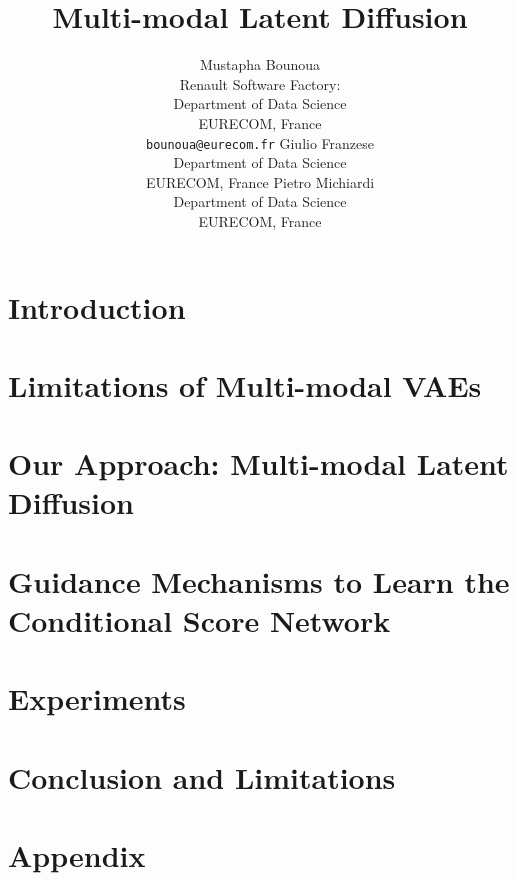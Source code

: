 \documentclass{article}
\title{Multi-modal Latent Diffusion}
\author{Mustapha Bounoua  \\\small{Renault Software Factory}:
 \\ \small{Department of Data Science}
  \\ \small{EURECOM, France}  \\ \small{\texttt{bounoua@eurecom.fr}}  \And
	 Giulio Franzese \\ \small{Department of Data Science} \\
  \small{EURECOM, France} \And
	 Pietro Michiardi \\ \small{Department of Data Science }
  \\ \small{EURECOM, France}
}
\begin{document}
\maketitle

\begin{abstract}

\end{abstract}

\section{Introduction}\label{sec:introduction}

\section{Limitations of Multi-modal VAEs}\label{sec:motivation}


\section{Our Approach: Multi-modal Latent Diffusion}\label{sec:method}


\section{Guidance Mechanisms to Learn the Conditional Score Network}\label{sec:mld_var}


\section{Experiments}\label{sec:experiments}
\label{sec:exp}


\section{Conclusion and Limitations}\label{sec:conclusion}






\appendix

\newpage
\section{Appendix}\label{sec:apdx}

\end{document}

